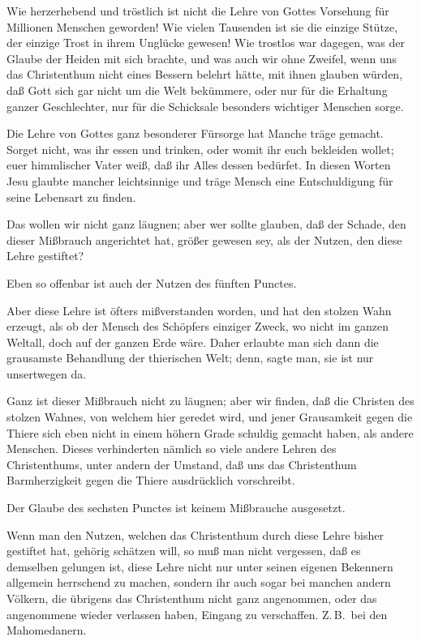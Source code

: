 \begin{aufza}
\item Wie herzerhebend und tröstlich ist nicht die Lehre von Gottes Vorsehung für Millionen Menschen geworden! Wie vielen Tausenden ist sie die einzige Stütze, der einzige Trost in ihrem Unglücke gewesen! Wie trostlos war dagegen, was der Glaube der Heiden mit sich brachte, und was auch wir ohne Zweifel, wenn uns das Christenthum nicht eines Bessern belehrt hätte, mit ihnen glauben würden, daß Gott sich gar nicht um die Welt bekümmere, oder nur für die Erhaltung ganzer Geschlechter, nur für die Schicksale besonders wichtiger Menschen sorge.\par
{} Die Lehre von Gottes ganz besonderer Fürsorge hat Manche träge gemacht. Sorget nicht, was ihr essen und trinken, oder womit ihr euch bekleiden wollet; euer himmlischer Vater weiß, daß ihr Alles dessen bedürfet. In diesen Worten Jesu glaubte mancher leichtsinnige und träge Mensch eine Entschuldigung für seine Lebensart zu finden.~\par
{} Das wollen wir nicht ganz läugnen; aber wer sollte glauben, daß der Schade, den dieser Mißbrauch angerichtet hat, größer gewesen sey, als der Nutzen, den diese Lehre gestiftet?
\item Eben so offenbar ist auch der Nutzen des fünften Punctes.\par
{} Aber diese Lehre ist öfters mißverstanden worden, und hat den stolzen Wahn erzeugt, als ob der Mensch des Schöpfers einziger Zweck, wo nicht im ganzen Weltall, doch auf der ganzen Erde wäre. Daher erlaubte man sich dann die grausamste Behandlung der thierischen Welt; denn, sagte man, sie ist nur unsertwegen da.\par
{} Ganz ist dieser Mißbrauch nicht zu läugnen; aber wir finden, daß die Christen des stolzen Wahnes, von welchem hier geredet wird, und jener Grausamkeit gegen die Thiere sich eben nicht in einem höhern Grade schuldig gemacht haben, als andere Menschen. Dieses verhinderten nämlich so viele andere Lehren des Christenthums, unter andern der Umstand, daß uns das Christenthum Barmherzigkeit gegen die Thiere ausdrücklich vorschreibt.
\item Der Glaube des sechsten Punctes ist keinem Mißbrauche ausgesetzt.
\item Wenn man den Nutzen, welchen das Christenthum durch diese Lehre bisher gestiftet hat, gehörig schätzen will, so muß man nicht vergessen, daß es demselben gelungen ist, diese Lehre nicht nur unter seinen eigenen Bekennern allgemein herrschend zu machen, sondern ihr auch sogar bei manchen andern Völkern, die übrigens das Christenthum nicht ganz angenommen, oder das angenommene wieder verlassen haben, Eingang zu verschaffen. Z.\,B.\ bei den Mahomedanern.
\end{aufza}

